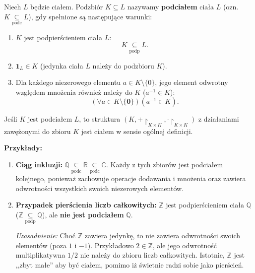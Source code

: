 \begin{definition}[Podciało]
Niech $L$ będzie ciałem. Podzbiór $K \subseteq L$ nazywamy \textbf{podciałem} ciała $L$ (ozn. $K \underset{\text{podc}}{\subseteq} L$), gdy spełnione są następujące warunki:
\begin{enumerate}
	\item $K$ jest podpierścieniem ciała $L$:  \[ K\underset{\scriptscriptstyle\text{podp}}{\subseteq} L .\]
    \item $\mathbf{1}_L \in K$ (jedynka ciała $L$ należy do podzbioru $K$).
    \item Dla każdego niezerowego elementu $a \in K \setminus \{0\}$, jego element odwrotny względem mnożenia również należy do $K$ ($a^{-1} \in K$):
	    \[
	     \left(\forall a \in K\setminus \{\mathbf{0}\}  \right) \left( a^{-1}\in K \right)
	    .\] 
\end{enumerate}
\end{definition}

\begin{remark}
Jeśli $K$ jest podciałem $L$, to struktura $\left( K, +\restriction_{\scriptscriptstyle K\times K}, \cdot\restriction_{\scriptscriptstyle K\times K} \right) $  z działaniami zawężonymi do zbioru $K$ jest ciałem w sensie ogólnej definicji.
\end{remark}

\noindent \textbf{Przykłady:}
\begin{enumerate}[label=\arabic*)]
    	\item \textbf{Ciąg inkluzji:} $\mathbb{Q} \underset{\text{podc}}{\subseteq} \mathbb{R} \underset{\text{podc}}{\subseteq} \mathbb{C}$. Każdy z tych zbiorów jest podciałem kolejnego, ponieważ zachowuje operacje dodawania i mnożenia oraz zawiera odwrotności wszystkich swoich niezerowych elementów.
    	\item \textbf{Przypadek pierścienia liczb całkowitych:} $\mathbb{Z}$ jest podpierścieniem ciała $\mathbb{Q}$ ($\mathbb{Z} \underset{\text{podp}}{\subseteq} \mathbb{Q}$), ale \textbf{nie jest podciałem} $\mathbb{Q}$. 

    \textit{Uzasadnienie:} Choć $\mathbb{Z}$ zawiera jedynkę, to nie zawiera odwrotności swoich elementów (poza $1$ i $-1$). Przykładowo $2 \in \mathbb{Z}$, ale jego odwrotność multiplikatywna $1/2$ nie należy do zbioru liczb całkowitych. Istotnie, $\mathbb{Z} $ jest ,,zbyt małe'' aby być ciałem, pomimo iż świetnie radzi sobie jako pierścień.
\end{enumerate}

